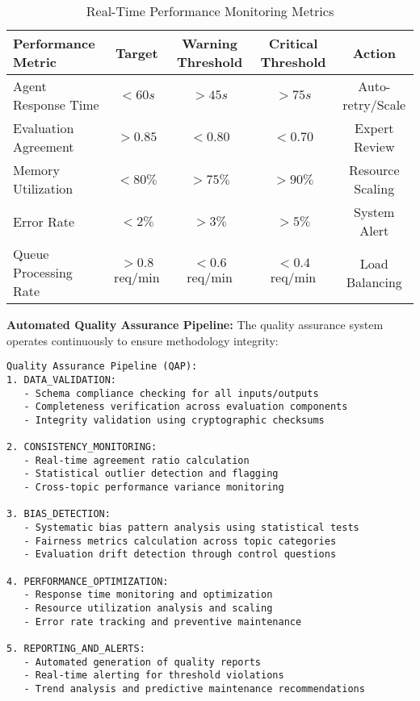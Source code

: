 \begin{table}[H]
\centering
\caption[Performance Monitoring Dashboard]{Real-Time Performance Monitoring Metrics}
\label{tab:performance-monitoring}
\begin{tabular}{lcccc}
\toprule
\textbf{Performance Metric} & \textbf{Target} & \textbf{Warning Threshold} & \textbf{Critical Threshold} & \textbf{Action} \\
\midrule
Agent Response Time & $< 60s$ & $> 45s$ & $> 75s$ & Auto-retry/Scale \\
Evaluation Agreement & $> 0.85$ & $< 0.80$ & $< 0.70$ & Expert Review \\
Memory Utilization & $< 80\%$ & $> 75\%$ & $> 90\%$ & Resource Scaling \\
Error Rate & $< 2\%$ & $> 3\%$ & $> 5\%$ & System Alert \\
Queue Processing Rate & $> 0.8$ req/min & $< 0.6$ req/min & $< 0.4$ req/min & Load Balancing \\
\bottomrule
\end{tabular}
\end{table}

\textbf{Automated Quality Assurance Pipeline:}
The quality assurance system operates continuously to ensure methodology integrity:

\begin{verbatim}
Quality Assurance Pipeline (QAP):
1. DATA_VALIDATION:
   - Schema compliance checking for all inputs/outputs
   - Completeness verification across evaluation components
   - Integrity validation using cryptographic checksums

2. CONSISTENCY_MONITORING:
   - Real-time agreement ratio calculation
   - Statistical outlier detection and flagging
   - Cross-topic performance variance monitoring

3. BIAS_DETECTION:
   - Systematic bias pattern analysis using statistical tests
   - Fairness metrics calculation across topic categories
   - Evaluation drift detection through control questions

4. PERFORMANCE_OPTIMIZATION:
   - Response time monitoring and optimization
   - Resource utilization analysis and scaling
   - Error rate tracking and preventive maintenance

5. REPORTING_AND_ALERTS:
   - Automated generation of quality reports
   - Real-time alerting for threshold violations
   - Trend analysis and predictive maintenance recommendations
\end{verbatim}

